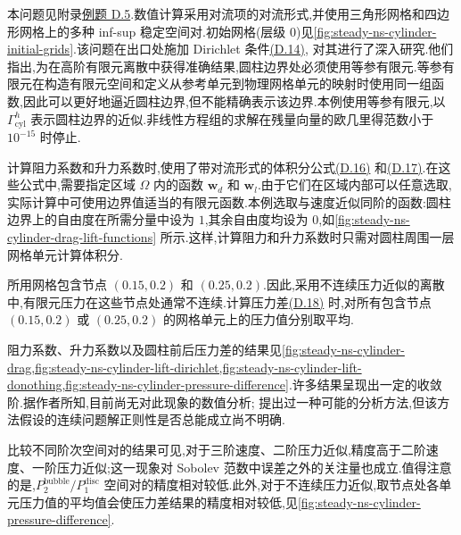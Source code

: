 
\begin{example}[二维绕圆柱流动]\label{ex:steady-ns-flow-around-cylinder}
本问题见附录\hyperref[ex:appendix-d-5]{例题 D.5}.数值计算采用对流项的对流形式,并使用三角形网格和四边形网格上的多种 inf-sup 稳定空间对.初始网格(层级 0)见\cref{fig:steady-ns-cylinder-initial-grids}.该问题在出口处施加 Dirichlet 条件\hyperref[eq:appendix-d-14]{(D.14)},\textcite{JohnMatthies2001} 对其进行了深入研究.他们指出,为在高阶有限元离散中获得准确结果,圆柱边界处必须使用等参有限元.等参有限元在构造有限元空间和定义从参考单元到物理网格单元的映射时使用同一组函数,因此可以更好地逼近圆柱边界,但不能精确表示该边界.本例使用等参有限元,以 $\Gamma_{\mathrm{cyl}}^h$ 表示圆柱边界的近似.非线性方程组的求解在残量向量的欧几里得范数小于 $10^{-15}$ 时停止.

计算阻力系数和升力系数时,使用了带对流形式的体积分公式\hyperref[eq:appendix-d-16]{(D.16)} 和\hyperref[eq:appendix-d-17]{(D.17)}.在这些公式中,需要指定区域 $\Omega$ 内的函数 $\bm{w}_d$ 和 $\bm{w}_l$.由于它们在区域内部可以任意选取,实际计算中可使用边界值适当的有限元函数.本例选取与速度近似同阶的函数:圆柱边界上的自由度在所需分量中设为 $1$,其余自由度均设为 $0$,如\cref{fig:steady-ns-cylinder-drag-lift-functions} 所示.这样,计算阻力和升力系数时只需对圆柱周围一层网格单元计算体积分.

所用网格包含节点 $(0.15,0.2)$ 和 $(0.25,0.2)$.因此,采用不连续压力近似的离散中,有限元压力在这些节点处通常不连续.计算压力差\hyperref[eq:appendix-d-18]{(D.18)} 时,对所有包含节点 $(0.15,0.2)$ 或 $(0.25,0.2)$ 的网格单元上的压力值分别取平均.

阻力系数、升力系数以及圆柱前后压力差的结果见\cref{fig:steady-ns-cylinder-drag,fig:steady-ns-cylinder-lift-dirichlet,fig:steady-ns-cylinder-lift-donothing,fig:steady-ns-cylinder-pressure-difference}.许多结果呈现出一定的收敛阶.据作者所知,目前尚无对此现象的数值分析;\textcite{JohnTabataTobiska1998} 提出过一种可能的分析方法,但该方法假设的连续问题解正则性是否总能成立尚不明确.

比较不同阶次空间对的结果可见,对于三阶速度、二阶压力近似,精度高于二阶速度、一阶压力近似;这一现象对 Sobolev 范数中误差之外的关注量也成立.值得注意的是,$P_2^{\mathrm{bubble}}/P_1^{\mathrm{disc}}$ 空间对的精度相对较低.此外,对于不连续压力近似,取节点处各单元压力值的平均值会使压力差结果的精度相对较低,见\cref{fig:steady-ns-cylinder-pressure-difference}.


\end{example}
